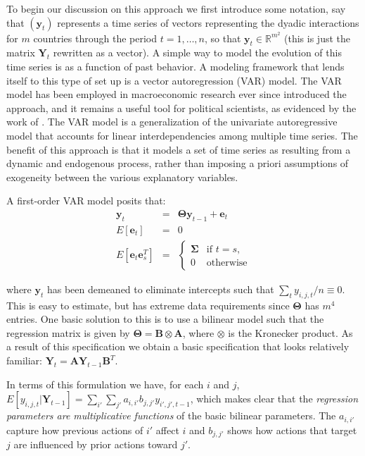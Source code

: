 \documentclass[3p,times,twocolumn,authoryear,12pt]{elsarticle}
\newcommand{\bl}[1]{{\mathbf #1}}
\begin{document}
To begin our discussion on this approach we first introduce some notation, say that $(\mathbf y_t)$ represents a time series of vectors representing the dyadic interactions for $m$ countries through the period $t = 1, \ldots, n$, so that $\mathbf y_t \in \mathbb{R}^{m^2}$ (this is just the matrix $\bl Y_t$ rewritten as a vector). A simple way to model the evolution of this time series is as a function of past behavior. A modeling framework that lends itself to this type of set up is a vector autoregression (VAR) model. The VAR model has been employed in macroeconomic research ever since \citet{sims:1980} introduced the approach, and it remains a useful tool for political scientists, as evidenced by the work of \citet{brandt:freeman:2006, davies:2014, tahk:2015}. The VAR model is a generalization of the univariate autoregressive model that accounts for linear interdependencies among multiple time series. The benefit of this approach is that it models a set of time series as resulting from a dynamic and endogenous process, rather than imposing a priori assumptions of exogeneity between the various explanatory variables. 

A first-order VAR model posits that:
\begin{eqnarray}
	\bl y_t &=& { \bl \Theta \bl y_{t-1} +\bl e_t}\\
	E[\bl e_t] &=& 0 \\
	E[\bl e_t \bl e^T_s] &=& \begin{cases}  \bl \Sigma &\mbox{if } t=s, \\ 0 &\mbox{otherwise}\end{cases}
\end{eqnarray}

\noindent where $\bl y_t$ has been demeaned to eliminate intercepts such that $\sum_t y_{i,j,t}/n \equiv 0$. This is easy to estimate, but has extreme data requirements since $\bl \Theta$ has $m^4$ entries. One basic solution to this is to use a bilinear model such that the regression matrix is given by $\bl \Theta = \bl B \otimes \bl A$, where $\otimes$ is the Kronecker product. As a result of this specification we obtain a basic specification that looks relatively familiar: $\bl Y_t = \bl A\bl Y_{t-1}\bl B^T$. 

In terms of this formulation we have, for each $i$ and $j$, $E[y_{i,j,t}| \bl Y_{t-1}] = \sum_{i'} \sum_{j'} a_{i,i'} b_{j,j'} y_{i',j',t-1}$, which makes clear that the {\em regression parameters are multiplicative functions} of the basic bilinear parameters. The $a_{i,i'}$ capture how previous actions of $i'$ affect $i$ and $b_{j,j'}$ shows how actions that target $j$ are influenced by prior actions toward $j'$.
\end{document}
